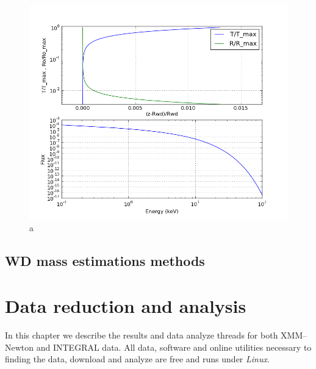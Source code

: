 \documentclass[oneside,a4paper,11pt]{report}
\begin{document}
\begin{figure}[hbt]
\centering
\includegraphics[totalheight=10cm]{model/image}
\caption{a}
\label{koc_mod} 
\end{figure}



\section{WD mass estimations methods}






\chapter{Data reduction and analysis}
In this chapter we describe the results and data analyze threads for both XMM--Newton and INTEGRAL data. 
All data, software and online utilities necessary to finding the data, download and analyze are free 
and runs under \textit{Linux}.  
\end{document}
